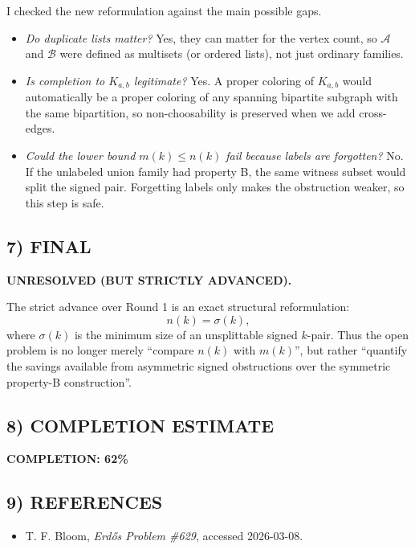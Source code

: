 I checked the new reformulation against the main possible gaps.

\begin{itemize}
\item \emph{Do duplicate lists matter?}  
Yes, they can matter for the vertex count, so \(\mathcal A\) and \(\mathcal B\) were defined as multisets (or ordered lists), not just ordinary families.

\item \emph{Is completion to \(K_{a,b}\) legitimate?}  
Yes. A proper coloring of \(K_{a,b}\) would automatically be a proper coloring of any spanning bipartite subgraph with the same bipartition, so non-choosability is preserved when we add cross-edges.

\item \emph{Could the lower bound \(m(k)\le n(k)\) fail because labels are forgotten?}  
No. If the unlabeled union family had property B, the same witness subset would split the signed pair. Forgetting labels only makes the obstruction weaker, so this step is safe.
\end{itemize}

\subsection*{7) FINAL}

\textbf{UNRESOLVED (BUT STRICTLY ADVANCED).}

The strict advance over Round 1 is an exact structural reformulation:
\[
n(k)=\sigma(k),
\]
where \(\sigma(k)\) is the minimum size of an unsplittable signed \(k\)-pair.
Thus the open problem is no longer merely ``compare \(n(k)\) with \(m(k)\)'', but rather
``quantify the savings available from asymmetric signed obstructions over the symmetric property-B construction''.

\subsection*{8) COMPLETION ESTIMATE}

\textbf{COMPLETION: 62\%}

\subsection*{9) REFERENCES}

\begin{itemize}
\item[\textbf{[Bloom629]}] T. F. Bloom, \emph{Erd\H{o}s Problem \#629}, accessed 2026-03-08.
\end{itemize}
